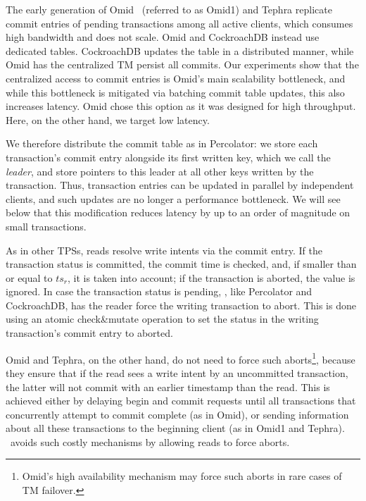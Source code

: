 The early generation of Omid~\cite{OmidICDE2014} (referred to as Omid1) and Tephra replicate commit entries 
of pending transactions among all active clients, 
which consumes high bandwidth and does not scale. Omid and CockroachDB instead use dedicated tables. CockroachDB updates the table in a distributed manner, 
while Omid has the centralized TM persist all commits. 
Our experiments show that the centralized access to commit entries is Omid's main scalability bottleneck, 
and while this bottleneck is mitigated via batching commit table updates, this also increases latency.
Omid chose this  option as it was designed for high throughput. Here, on the other hand, we target  low latency. 

We therefore distribute the commit table as in Percolator: we  
store each transaction's commit entry alongside its first written key,
which we call the \emph{leader}, and store pointers to this leader at all other keys written by the transaction. 
Thus,  transaction entries can be updated in parallel by 
independent clients, and such updates are no longer a performance bottleneck. 
We will see below that this modification reduces latency
by up to an order of magnitude on small transactions.

As in other TPSs, reads resolve write intents via the commit entry.
If the transaction status is committed, the commit time is checked, and, if smaller than or equal to $ts_r$, it is taken into account;
if the transaction is aborted, the value is ignored.
In case the transaction status is pending, \sys, like Percolator and CockroachDB, has the reader
force the writing transaction to abort. This is done using an atomic check\&mutate operation to set the status in the
writing transaction's commit entry to aborted.

Omid and Tephra, on the other hand, do not need to force such aborts\footnote{Omid's high availability mechanism  
may force such aborts in rare cases of TM failover.}, because they ensure that  if the read sees a write intent
by an uncommitted transaction, the latter will not commit with an earlier timestamp than the read.
This is achieved  
either by delaying begin and commit requests until all transactions that concurrently attempt to commit complete (as in Omid),
or sending information about all these transactions to the beginning client (as in Omid1 and Tephra).
\sys\ avoids such costly mechanisms by allowing reads to force aborts. 

